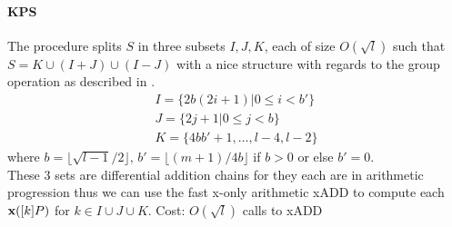 \documentclass[../main.tex]{subfiles}
\begin{document}
\paragraph{KPS} The procedure  splits $S$ in three subsets $I,J,K$, each of size $O(\sqrt{l})$ such that $S = K\cup(I+J)\cup(I-J)$ with a nice structure with regards to the group operation as described in \cite{}.
\[\begin{array}{l}I = \{2b(2i+1)|0\leq i<b'\} \\
J = \{2j+1|0\leq j<b\} \\
K=\{4bb'+1, \ldots, l-4, l-2\}\end{array}\]
where $b=\lfloor \sqrt{l-1}/2\rfloor,\, b'=\lfloor (m+1)/4b \rfloor$ if $b>0$ or else $b'=0$.\\
These 3 sets are differential addition chains for they each are in arithmetic progression thus we can use the fast x-only arithmetic xADD to compute each $\textbf{x}([k]P)$ for $k\in I\cup J\cup K$.
Cost: $O(\sqrt{l})$ calls to xADD
\end{document}
